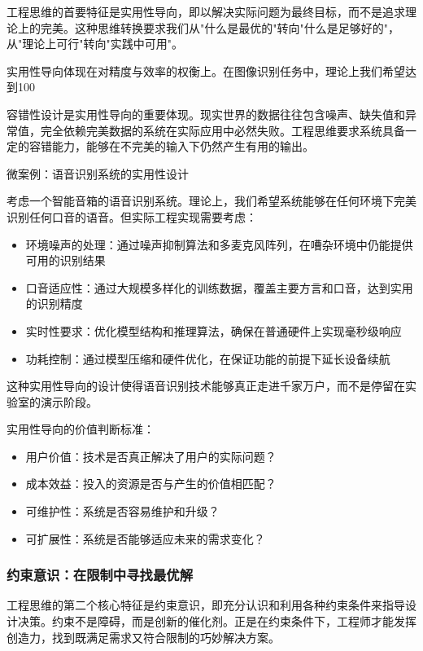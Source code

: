 工程思维的首要特征是实用性导向，即以解决实际问题为最终目标，而不是追求理论上的完美。这种思维转换要求我们从"什么是最优的"转向"什么是足够好的"，从"理论上可行"转向"实践中可用"。

实用性导向体现在对精度与效率的权衡上。在图像识别任务中，理论上我们希望达到100%

容错性设计是实用性导向的重要体现。现实世界的数据往往包含噪声、缺失值和异常值，完全依赖完美数据的系统在实际应用中必然失败。工程思维要求系统具备一定的容错能力，能够在不完美的输入下仍然产生有用的输出。

微案例：语音识别系统的实用性设计

考虑一个智能音箱的语音识别系统。理论上，我们希望系统能够在任何环境下完美识别任何口音的语音。但实际工程实现需要考虑：

\begin{itemize}
\item 环境噪声的处理：通过噪声抑制算法和多麦克风阵列，在嘈杂环境中仍能提供可用的识别结果
\item 口音适应性：通过大规模多样化的训练数据，覆盖主要方言和口音，达到实用的识别精度
\item 实时性要求：优化模型结构和推理算法，确保在普通硬件上实现毫秒级响应
\item 功耗控制：通过模型压缩和硬件优化，在保证功能的前提下延长设备续航
\end{itemize}

这种实用性导向的设计使得语音识别技术能够真正走进千家万户，而不是停留在实验室的演示阶段。

实用性导向的价值判断标准：

\begin{itemize}
\item 用户价值：技术是否真正解决了用户的实际问题？
\item 成本效益：投入的资源是否与产生的价值相匹配？
\item 可维护性：系统是否容易维护和升级？
\item 可扩展性：系统是否能够适应未来的需求变化？
\end{itemize}

\subsubsection{约束意识：在限制中寻找最优解}

工程思维的第二个核心特征是约束意识，即充分认识和利用各种约束条件来指导设计决策。约束不是障碍，而是创新的催化剂。正是在约束条件下，工程师才能发挥创造力，找到既满足需求又符合限制的巧妙解决方案。

